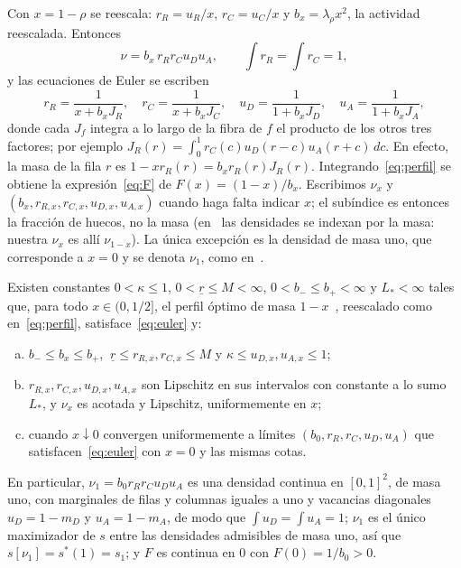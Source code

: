 Con $x=1-\rho$ se reescala: $r_R=u_R/x$, $r_C=u_C/x$ y $b_x=\lambda_\rho x^2$, la actividad reescalada.
Entonces
\begin{equation}\label{eq:perfil}
 \nu=b_x\,r_Rr_Cu_Du_A,\qquad \int r_R=\int r_C=1,
\end{equation}
y las ecuaciones de Euler se escriben
\begin{equation}\label{eq:euler}
 r_R=\frac1{x+b_xJ_R},\quad r_C=\frac1{x+b_xJ_C},\quad
 u_D=\frac1{1+b_xJ_D},\quad u_A=\frac1{1+b_xJ_A},
\end{equation}
donde cada $J_f$ integra a lo largo de la fibra de $f$ el producto de los otros tres factores;
por ejemplo $J_R(r)=\int_0^1r_C(c)u_D(r-c)u_A(r+c)\,dc$. En efecto, la masa de la fila $r$ es
$1-xr_R(r)=b_xr_R(r)J_R(r)$. Integrando~\eqref{eq:perfil} se obtiene la expresión~\eqref{eq:F}
de $F(x)=(1-x)/b_x$. Escribimos $\nu_x$ y $(b_x,r_{R,x},r_{C,x},u_{D,x},u_{A,x})$ cuando haga
falta indicar $x$; el subíndice es entonces la fracción de huecos, no la masa
(en~\cite{Perfil} las densidades se indexan por la masa: nuestra $\nu_x$ es allí $\nu_{1-x}$). La única
excepción es la densidad de masa uno, que corresponde a $x=0$ y se denota $\nu_1$, como
en~\cite{Perfil}.

\begin{teorema}\label{thm:perfil}
Existen constantes $0<\kappa\le1$, $0<\underline r\le M<\infty$, $0<b_-\le b_+<\infty$ y
$L_*<\infty$ tales que, para todo $x\in(0,1/2]$, el perfil óptimo de masa $1-x$~\cite[Teorema~3.1]{Perfil},
reescalado como
en~\eqref{eq:perfil}, satisface~\eqref{eq:euler} y:
\begin{enumerate}[(a)]
\item $b_-\le b_x\le b_+$, $\ \underline r\le r_{R,x},r_{C,x}\le M$ y
$\kappa\le u_{D,x},u_{A,x}\le1$;
\item $r_{R,x},r_{C,x},u_{D,x},u_{A,x}$ son Lipschitz en sus intervalos con constante a lo sumo
$L_*$, y $\nu_x$ es acotada y Lipschitz, uniformemente en $x$;
\item cuando $x\downarrow0$ convergen uniformemente a límites $(b_0,r_R,r_C,u_D,u_A)$ que
satisfacen~\eqref{eq:euler} con $x=0$ y las mismas cotas.
\end{enumerate}
En particular, $\nu_1=b_0r_Rr_Cu_Du_A$ es una densidad continua en $[0,1]^2$, de masa uno, con
marginales de filas y columnas iguales a uno y vacancias diagonales $u_D=1-m_D$ y $u_A=1-m_A$, de
modo que $\int u_D=\int u_A=1$; $\nu_1$ es el único maximizador de $s$ entre las densidades
admisibles de masa uno, así que $s[\nu_1]=s^*(1)=s_1$; y $F$ es continua en $0$ con
$F(0)=1/b_0>0$.
\end{teorema}

